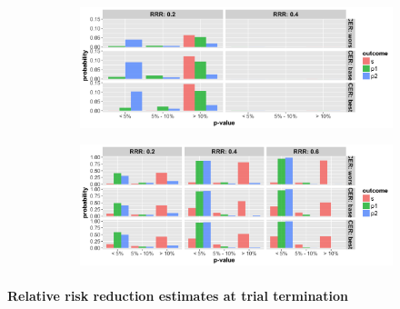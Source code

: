 \documentclass[]{article}
\let\oldparagraph\paragraph
\renewcommand{\paragraph}[1]{\oldparagraph{#1}\mbox{}}
\begin{document}
\begin{figure}
\centering
  \caption{Probability that the p-value (from Fisher’s exact test) at termination of the trial is below 5\%, between 5\%
  and 10\% and greater than 10\% for cases where trial was (a) stopped for futility; (b) stopped for superiority. The
  rows represent the three control even rate scenarios and the three columns present the three relative risk reduction
  scenarios. Note: the denominator in each figure is the number of simulations (not the number of trials stopped for
  futility (a) or superiority (b), and thus, the proportions do not add up to 100\% within one figure. Further, (a) and
  (b) do not include simulations where the trial went to the max. allowed sample size. The bars should be interpreted
  with respect to the relative proportion that fit in each category.}
  \begin{subfigure}{0.8\textwidth}
    \centering
    \caption{}
    \includegraphics{../plots/stop_p1_new/pvalue_fut_sim_05_stopp1_new.png}
  \end{subfigure}
  \bigbreak
  \begin{subfigure}{0.8\textwidth}
    \centering
    \caption{}
    \includegraphics{../plots/stop_p1_new/pvalue_sup_sim_05_stopp1_new.png}
  \end{subfigure}
\end{figure}

\hypertarget{relative-risk-reduction-estimates-at-trial-termination}{%
\paragraph{Relative risk reduction estimates at trial
termination}\label{relative-risk-reduction-estimates-at-trial-termination}}
\end{document}
